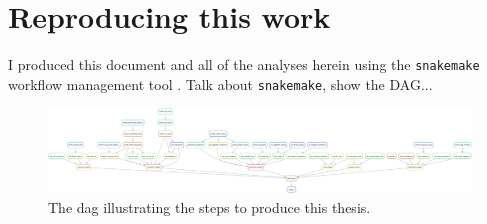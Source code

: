 \section{Reproducing this work}
I produced this document and all of the analyses herein using the
\texttt{snakemake} workflow management tool \cite{molder_sustainable_2021}. Talk
about \texttt{snakemake}, show the DAG... 

    \begin{figure}
            \centering
            \includegraphics[width=\columnwidth]{../analysis/dag.png}
            \caption{The \ac{dag} illustrating the steps to produce this
            thesis.}
            \label{fig:dag}
    \end{figure}
